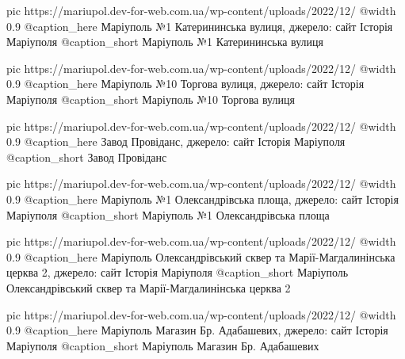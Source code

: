   pic https://mariupol.dev-for-web.com.ua/wp-content/uploads/2022/12/%
  @width 0.9
  @caption_here Маріуполь №1 Катерининська вулиця, джерело: сайт Історія Маріуполя
  @caption_short Маріуполь №1 Катерининська вулиця

  pic https://mariupol.dev-for-web.com.ua/wp-content/uploads/2022/12/%
  @width 0.9
  @caption_here Маріуполь №10 Торгова вулиця, джерело: сайт Історія Маріуполя
  @caption_short Маріуполь №10 Торгова вулиця

  pic https://mariupol.dev-for-web.com.ua/wp-content/uploads/2022/12/%
  @width 0.9
  @caption_here Завод Провіданс, джерело: сайт Історія Маріуполя
  @caption_short Завод Провіданс

  pic https://mariupol.dev-for-web.com.ua/wp-content/uploads/2022/12/%
  @width 0.9
  @caption_here Маріуполь №1 Олександрівська площа, джерело: сайт Історія Маріуполя
  @caption_short Маріуполь №1 Олександрівська площа

  pic https://mariupol.dev-for-web.com.ua/wp-content/uploads/2022/12/%
  @width 0.9
  @caption_here Маріуполь Олександрівський сквер та Марії-Магдалинінська церква 2, джерело: сайт Історія Маріуполя
  @caption_short Маріуполь Олександрівський сквер та Марії-Магдалинінська церква 2

  pic https://mariupol.dev-for-web.com.ua/wp-content/uploads/2022/12/%
  @width 0.9
  @caption_here Маріуполь Магазин Бр. Адабашевих, джерело: сайт Історія Маріуполя
  @caption_short Маріуполь Магазин Бр. Адабашевих


